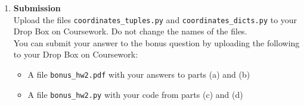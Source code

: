 \documentclass{article}
\newcounter{points}
\newcounter{bonuspoints}
\newcommand\setbonuspoint{\addtocounter{bonuspoints}{1}(1 bonus point)}
\newcommand\printpoints{Total number of points: \value{\thepoints}}
\begin{document}
\begin{enumerate}
\begin{tabular}{c}
\lstset{morekeywords={yield}}

\end{tabular}

\begin{enumerate}
\setcounter{enumii}{1}
\item
What gets printed with the following code?  Explain.  \setbonuspoint

\begin{tabular}{c}

\end{tabular}
\end{enumerate}

\begin{enumerate}
\setcounter{enumii}{2}
\item
Write a function \texttt{keyvals}, which takes as input a dictionary and returns a list of (key, value) tuples of all key-value pairs in the dictionary.   \setbonuspoint
\end{enumerate}

\begin{enumerate}
\setcounter{enumii}{3}
\item
Write a function \texttt{keyvals\_gen}, which is the generator function analog of \texttt{keyvals} from part (c). \setbonuspoint
\end{enumerate}

\vspace{0.3in}
\item \textbf{Submission} \\
Upload the files \texttt{coordinates\_tuples.py} and \texttt{coordinates\_dicts.py} to your Drop Box on Coursework.  Do not change the names of the files. \\

You can submit your answer to the bonus question by uploading the following to your Drop Box on Coursework:

\begin{itemize}
\item{ A file \texttt{bonus\_hw2.pdf} with your answers to parts  (a) and (b) }
\item{ A file \texttt{bonus\_hw2.py} with your code from parts (c) and (d) }
\end{itemize}

\end{enumerate}
\end{document}
